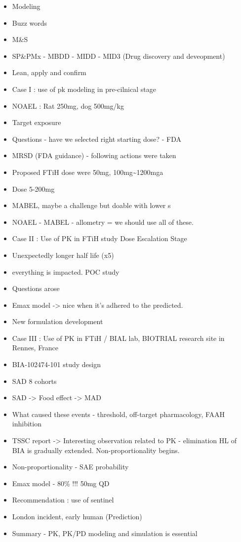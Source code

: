 \documentclass[]{book}
\providecommand{\tightlist}{%
  \setlength{\itemsep}{0pt}\setlength{\parskip}{0pt}}
\begin{document}
\begin{itemize}
\tightlist
\item
  Modeling
\item
  Buzz words
\item
  M\&S
\item
  SP\&PMx - MBDD - MIDD - MID3 (Drug discovery and deveopment)
\item
  Lean, apply and confirm
\item
  Case I : use of pk modeling in pre-cilnical stage
\item
  NOAEL : Rat 250mg, dog 500mg/kg
\item
  Target exposure
\item
  Questions - have we selected right starting dose? - FDA
\item
  MRSD (FDA guidance) - following actions were taken
\item
  Proposed FTiH dose were 50mg, 100mg\textasciitilde{}1200mga
\item
  Dose 5-200mg
\item
  MABEL, maybe a challenge but doable with lower s
\item
  NOAEL - MABEL - allometry = we should use all of these.
\item
  Case II : Use of PK in FTiH study Dose Escalation Stage
\item
  Unexpectedly longer half life (x5)
\item
  everything is impacted. POC study
\item
  Questions arose
\item
  Emax model -\textgreater{} nice when it's adhered to the predicted.
\item
  New formulation development
\item
  Case III : Use of PK in FTiH / BIAL lab, BIOTRIAL research site in
  Rennes, France
\item
  BIA-102474-101 study design
\item
  SAD 8 cohorts
\item
  SAD -\textgreater{} Food effect -\textgreater{} MAD
\item
  What caused these events - threshold, off-target pharmacology, FAAH
  inhibition
\item
  TSSC report -\textgreater{} Interesting observation related to PK -
  elimination HL of BIA is gradually extended. Non-proportionality
  begins.
\item
  Non-proportionality - SAE probability
\item
  Emax model - 80\% !!! 50mg QD
\item
  Recommendation : use of sentinel
\item
  London incident, early human (Prediction)
\item
  Summary - PK, PK/PD modeling and simulation is essential
\end{itemize}
\end{document}
